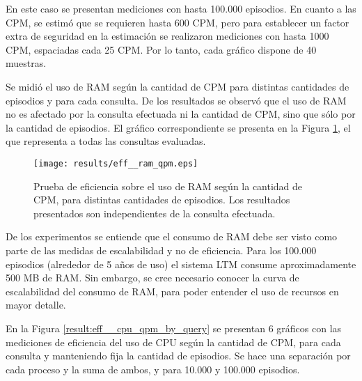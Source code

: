 En este caso se presentan mediciones con hasta 100.000 episodios. En cuanto a las CPM, se estimó que se requieren hasta 600 CPM, pero para establecer un factor extra de seguridad en la estimación se realizaron mediciones con hasta 1000 CPM, espaciadas cada 25 CPM. Por lo tanto, cada gráfico dispone de 40 muestras.


Se midió el uso de RAM según la cantidad de CPM para distintas cantidades de episodios y para cada consulta. De los resultados se observó que el uso de RAM no es afectado por la consulta efectuada ni la cantidad de CPM, sino que sólo por la cantidad de episodios. El gráfico correspondiente se presenta en la Figura \ref{result:eff__ram_qpm}, el que representa a todas las consultas evaluadas.

\begin{figure}[!ht]
	\centering
	\texttt{[image: results/eff\_\_ram\_qpm.eps]}
	\caption[Eficiencia: Uso de RAM según CPM, cantidad variable de episodios.]
	{\small Prueba de eficiencia sobre el uso de RAM según la cantidad de CPM, para distintas cantidades de episodios. Los resultados presentados son independientes de la consulta efectuada.}
	\label{result:eff__ram_qpm}
\end{figure}

De los experimentos se entiende que el consumo de RAM debe ser visto como parte de las medidas de escalabilidad y no de eficiencia. Para los 100.000 episodios (alrededor de 5 años de uso) el sistema LTM consume aproximadamente 500 MB de RAM. Sin embargo, se cree necesario conocer la curva de escalabilidad del consumo de RAM, para poder entender el uso de recursos en mayor detalle.


 En la Figura \ref{result:eff__cpu_qpm_by_query} se presentan 6 gráficos con las mediciones de eficiencia del uso de CPU según la cantidad de CPM, para cada consulta y manteniendo fija la cantidad de episodios. Se hace una separación por cada proceso y la suma de ambos, y para 10.000 y 100.000 episodios.

